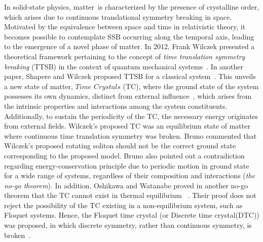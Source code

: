 \documentclass[%
nofootinbib,
reprint,
superscriptaddress,
amsmath,amssymb,showkeys,
aps,
prb,
]{revtex4-2}
\begin{document}
In solid-state physics, matter is characterized by the presence of crystalline order, which arises due to continuous translational symmetry breaking in space. Motivated by the equivalence between space and time in relativistic theory, it becomes possible to contemplate SSB occurring along the temporal axis, leading to the emergence of a novel phase of matter. In 2012, Frank Wilczek presented a theoretical framework pertaining to the concept of \textit{time translation symmetry breaking} (TTSB) in the context of quantum mechanical systems~\cite{wilczek_quantum_2012}. In another paper, Shapere and Wilczek proposed TTSB for a classical system~\cite{shapere_classical_2012}. This unveils a new state of matter, $\textit{Time Crystals}$ (TC), where the ground state of the system possesses its own dynamics, distinct from external influence~\cite{wilczek_quantum_2012}, which arises from the intrinsic properties and interactions among the system constituents. Additionally, to sustain the periodicity of the TC, the necessary energy originates from external fields. Wilczek's proposed TC was an equilibrium state of matter where continuous time translation symmetry was broken. {Bruno commented that Wilczek's proposed rotating soliton should not be the correct ground state  corresponding to the proposed model\cite{Bruno_comment_1}. Bruno also pointed out a contradiction regarding energy-conservation principle due to periodic motion in ground state for a wide range of systems, regardless of their composition and interactions (\textit{the no-go theorem})\cite{Bruno2013}. In addition}, Oshikawa and Watanabe proved {in another no-go theorem} that the TC cannot exist in thermal equilibrium  ~\cite{watanabe_absence_2015}. Their proof does not reject the possibility of the TC  existing in a non-equilibrium system, such as Floquet systems. Hence, the Floquet time crystal (or Discrete time crystal(DTC)) was proposed, in which discrete symmetry, rather than continuous symmetry, is broken~\cite{else_floquet_2016}.
\end{document}
